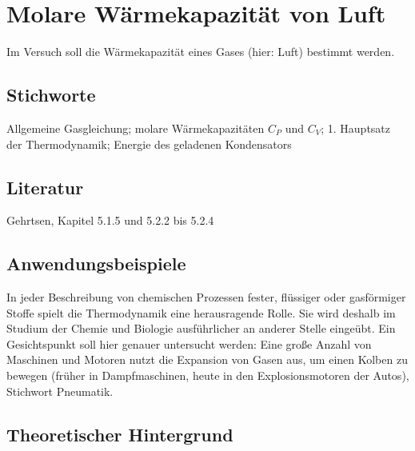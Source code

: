 \chapter{Molare Wärmekapazität von Luft}
\label{v:6}


Im Versuch soll die Wärmekapazität eines Gases (hier: Luft) bestimmt werden.

\section{Stichworte}

Allgemeine Gasgleichung; molare Wärmekapazitäten $C_P$ und $C_V$; 1. Hauptsatz der Thermodynamik; Energie des geladenen Kondensators
%
\section{Literatur}

Gehrtsen, Kapitel 5.1.5 und 5.2.2 bis 5.2.4
%
\section{Anwendungsbeispiele}
%
In jeder Beschreibung von chemischen Prozessen fester, flüssiger oder gasförmiger Stoffe spielt die Thermodynamik eine herausragende Rolle. Sie wird deshalb im Studium der Chemie und Biologie ausführlicher an anderer Stelle eingeübt. Ein Gesichtspunkt soll hier genauer untersucht werden: Eine große Anzahl von Maschinen und Motoren nutzt die Expansion von Gasen aus, um einen Kolben zu bewegen (früher in Dampfmaschinen, heute in den Explosionsmotoren der Autos), Stichwort Pneumatik.

%
\section{Theoretischer Hintergrund}


